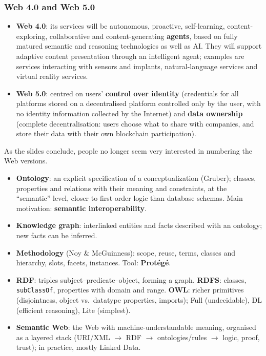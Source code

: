 \subsubsection{Web 4.0 and Web 5.0}

\begin{itemize}
  \item \textbf{Web 4.0}: its services will be autonomous, proactive, self-learning,
        content-exploring, collaborative and content-generating \textbf{agents}, based on
        fully matured semantic and reasoning technologies as well as AI. They will
        support adaptive content presentation through an intelligent agent; examples are
        services interacting with sensors and implants, natural-language services and
        virtual reality services.
  \item \textbf{Web 5.0}: centred on users' \textbf{control over identity} (credentials
        for all platforms stored on a decentralised platform controlled only by the
        user, with no identity information collected by the Internet) and \textbf{data
        ownership} (complete decentralisation: users choose what to share with
        companies, and store their data with their own blockchain participation).
\end{itemize}
As the slides conclude, people no longer seem very interested in numbering the Web
versions.

\begin{nbsummary}
\begin{itemize}[nosep]
  \item \textbf{Ontology}: an explicit specification of a conceptualization (Gruber);
        classes, properties and relations with their meaning and constraints, at the
        ``semantic'' level, closer to first-order logic than database schemas. Main
        motivation: \textbf{semantic interoperability}.
  \item \textbf{Knowledge graph}: interlinked entities and facts described with an
        ontology; new facts can be inferred.
  \item \textbf{Methodology} (Noy \& McGuinness): scope, reuse, terms, classes and
        hierarchy, slots, facets, instances. Tool: \textbf{Protégé}.
  \item \textbf{RDF}: triples subject--predicate--object, forming a graph.
        \textbf{RDFS}: classes, \texttt{subClassOf}, properties with domain and range.
        \textbf{OWL}: richer primitives (disjointness, object vs.\ datatype properties,
        imports); Full (undecidable), DL (efficient reasoning), Lite (simplest).
  \item \textbf{Semantic Web}: the Web with machine-understandable meaning, organised as
        a layered stack (URI/XML $\to$ RDF $\to$ ontologies/rules $\to$ logic, proof,
        trust); in practice, mostly Linked Data.
\end{itemize}
\end{nbsummary}
